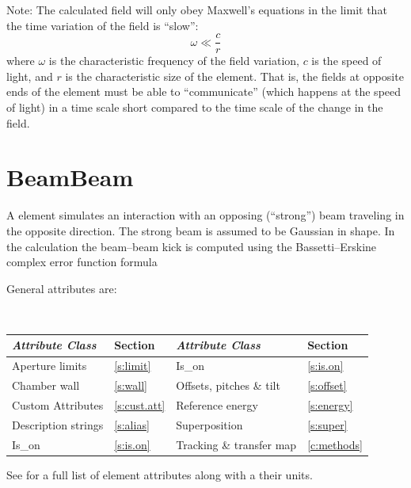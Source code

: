 Note: The calculated field will only obey Maxwell's equations in the limit that the time variation
of the field is ``slow'':
\begin{equation}
  \omega \ll \frac{c}{r}
\end{equation}
where $\omega$ is the characteristic frequency of the field variation, $c$ is the speed of light,
and $r$ is the characteristic size of the  element. That is, the fields at opposite
ends of the element must be able to ``communicate'' (which happens at the speed of light) in a time
scale short compared to the time scale of the change in the field.

\section{BeamBeam}
\label{s:bbi}

A  element simulates an interaction with an opposing
(``strong'') beam traveling in the opposite direction. The strong beam
is assumed to be Gaussian in shape. In the 
calculation the beam--beam kick is computed using the
Bassetti--Erskine complex error function formula\cite{b:talman}

General  attributes are:
\begin{center} 
\tt
\begin{tabular}{llll} \toprule
  {\sl Attribute Class}      & Section          & {\sl Attribute Class}      & Section         \\ \midrule
  Aperture limits            & \ref{s:limit}    & Is_on                      & \ref{s:is.on}   \\
  Chamber wall               & \ref{s:wall}     & Offsets, pitches \& tilt   & \ref{s:offset}  \\
  Custom Attributes          & \ref{s:cust.att} & Reference energy           & \ref{s:energy}  \\
  Description strings        & \ref{s:alias}    & Superposition              & \ref{s:super}   \\
  Is_on                      & \ref{s:is.on}    & Tracking \& transfer map   & \ref{c:methods} \\ 
  \bottomrule
\end{tabular}
\end{center}
\toffset
See  for a full list of element attributes along with a their units.

